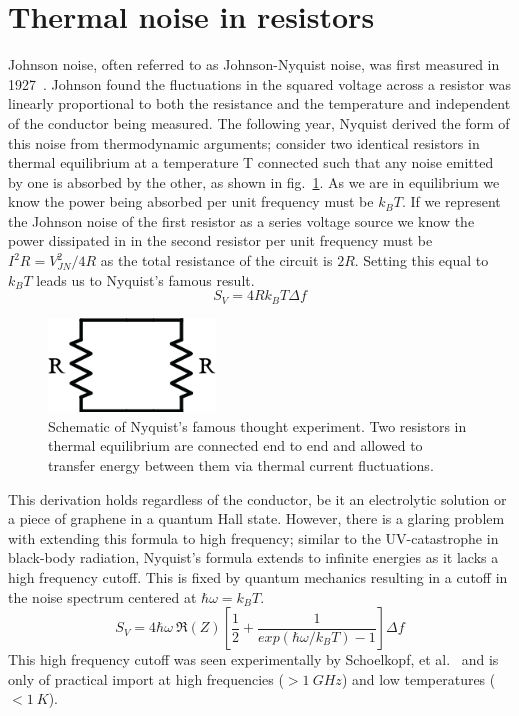\section{Thermal noise in resistors}
Johnson noise, often referred to as Johnson-Nyquist noise, was first measured in 1927~\cite{johnson_thermal_1927}. Johnson found the fluctuations in the squared voltage across a resistor was linearly proportional to both the resistance and the temperature and independent of the conductor being measured. The following year, Nyquist derived the form of this noise from thermodynamic arguments; consider two identical resistors in thermal equilibrium at a temperature T connected such that any noise emitted by one is absorbed by the other, as shown in fig.~\ref{fig:Nyquist_resistors}. As we are in equilibrium we know the power being absorbed per unit frequency must be $k_BT$. If we represent the Johnson noise of the first resistor as a series voltage source we know the power dissipated in in the second resistor per unit frequency must be $I^2R = V_{JN}^2 / 4R$ as the total resistance of the circuit is $2R$. Setting this equal to $k_BT$ leads us to Nyquist's famous result.
\begin{equation}\label{eq:Nyquist}
S_{V} = 4Rk_BT\Delta f
\end{equation}
\begin{figure}
\centering
\includegraphics[height = 25mm]{figures/Johnson_noise_thermometry/Nyquist_resistors.png}
\caption{Schematic of Nyquist's famous thought experiment. Two resistors in thermal equilibrium are connected end to end and allowed to transfer energy between them via thermal current fluctuations.}
\label{fig:Nyquist_resistors}
\end{figure}
This derivation holds regardless of the conductor, be it an electrolytic solution or a piece of graphene in a quantum Hall state. However, there is a glaring problem with extending this formula to high frequency; similar to the UV-catastrophe in black-body radiation, Nyquist's formula extends to infinite energies as it lacks a high frequency cutoff. This is fixed by quantum mechanics resulting in a cutoff in the noise spectrum centered at $\hbar\omega = k_BT$.
\begin{equation}\label{eq:NyquistFull}
S_V = 4\hbar\omega~\Re(Z)\left[\frac{1}{2}+\frac{1}{exp(\hbar\omega/k_BT)-1}\right]\Delta f
\end{equation}
This high frequency cutoff was seen experimentally by Schoelkopf, et al.~\cite{schoelkopf_frequency_1997} and is only of practical import at high frequencies ($>1~GHz$) and low temperatures ($<1~K$).


